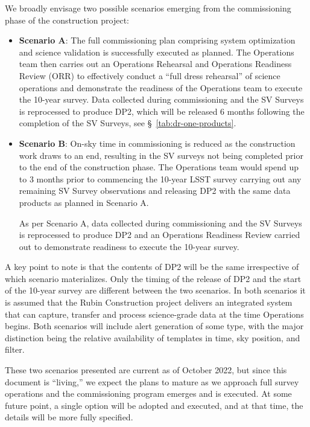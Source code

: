 We broadly envisage two possible scenarios emerging from the commissioning phase of the construction project:

\begin{itemize}
\item \textbf{Scenario A}:
The full commissioning plan comprising system optimization and science validation is successfully executed as planned.
The Operations team then carries out an Operations Rehearsal and Operations Readiness Review (ORR) to effectively conduct a ``full dress rehearsal'' of science operations and demonstrate the readiness of the Operations team to execute the 10-year survey.
Data collected during commissioning and the SV Surveys is reprocessed to produce DP2, which will be released 6 months following the completion of the SV Surveys, see \S~\ref{tab:dr-one-products}.

\item \textbf{Scenario B}:
On-sky time in commissioning is reduced as the construction work  draws to an end, resulting in the SV surveys not being completed prior to the end of the construction phase.
The Operations team would spend up to 3 months prior to commencing the 10-year LSST survey carrying out any remaining SV Survey observations and releasing DP2 with the same data products as planned in Scenario A.

As per Scenario A, data collected during commissioning and the SV Surveys is reprocessed to produce DP2 and an Operations Readiness Review carried out to demonstrate readiness to execute the 10-year survey.

\end{itemize}

A key point to note is that the contents of DP2 will be the same irrespective of which scenario materializes.
Only the timing of the release of DP2 and the start of the 10-year survey are different between the two scenarios.
In both scenarios it is assumed that the Rubin Construction project delivers an integrated system that can capture, transfer and process science-grade data at the time Operations begins.
Both scenarios will include alert generation of some type, with the major distinction being the relative availability of templates in time, sky position, and filter.


These two scenarios presented are current as of October 2022, but since this document is ``living,'' we expect the plans to mature as we approach full survey operations and the commissioning program emerges and is executed.
At some future point, a single option will be adopted and executed, and at that time, the details will be more fully specified.
